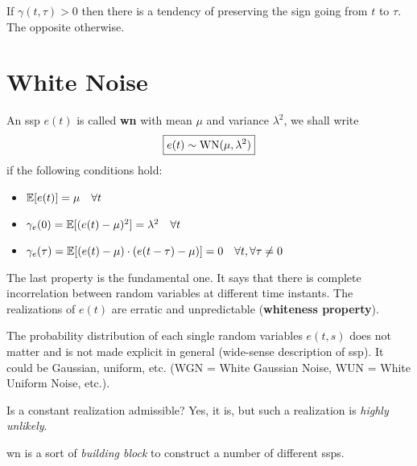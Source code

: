 \begin{obs}
If $\gamma(t, \tau)>0$ then there is a tendency of preserving the sign going from $t$ to $\tau $. The opposite otherwise.
\end{obs}
\section{White Noise}

An \gls{ssp} $e(t)$ is called \textbf{\gls{wn}} with mean $\mu$ and variance $\lambda^{2}$, we shall write
\[
	\boxed{e(t) \sim \operatorname{WN}(\mu, \lambda^{2})}
\]
if the following conditions hold:
\begin{itemize}
	\item $\mathbb{E}[e(t)]=\mu \quad \forall t$
	\item $\gamma_{e}(0)=\mathbb{E}[(e(t)-\mu)^{2}]=\lambda^{2} \quad \forall t$
	\item $\gamma_{e}(\tau)=\mathbb{E}[(e(t)-\mu) \cdot(e(t-\tau)-\mu)]=0 \quad \forall t, \forall \tau \neq 0$
\end{itemize}

The last property is the fundamental one. It says that there is complete incorrelation between random variables at different time instants. The realizations of $e(t)$ are erratic and unpredictable (\textbf{whiteness property}).

\begin{figure}[htpb]
	\centering
\end{figure}
\FloatBarrier

\begin{obs}
The probability distribution of each single random variables $e(t,s)$ does not matter and is not made explicit in general (wide-sense description of \gls{ssp}).
It could be Gaussian, uniform, etc. (WGN = White Gaussian Noise, WUN = White Uniform Noise, etc.).
\end{obs}

\begin{obs}
Is a constant realization admissible? Yes, it is, but such a realization is \emph{highly unlikely}.
\end{obs}
\gls{wn} is a sort of \emph{building block} to construct a number of different \glspl{ssp}.

